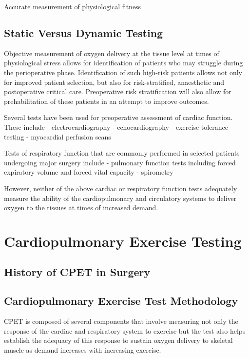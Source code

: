 Accurate measurement of physiological fitness 

\subsection{Static Versus Dynamic Testing}

Objective measurement of oxygen delivery at the tissue level at times of physiological stress allows for identification of patients who may struggle during the perioperative phase. Identification of such high-risk patients allows not only for improved patient selection, but also for risk-stratified, anaesthetic and postoperative critical care. Preoperative risk stratification will also allow for prehabilitation of these patients in an attempt to improve outcomes. 

Several tests have been used for preoperative assessment of cardiac function. These include 
- electrocardiography 
- echocardiography 
- exercise tolerance testing 
- myocardial perfusion scans 

Tests of respiratory function that are commonly performed in selected patients undergoing major surgery include 
- pulmonary function tests including forced expiratory volume and forced vital capacity 
- spirometry 

However, neither of the above cardiac or respiratory function tests adequately measure the ability of the cardiopulmonary and circulatory systems to deliver oxygen to the tissues at times of increased demand.

\section{Cardiopulmonary Exercise Testing}
\subsection{History of CPET in Surgery}

\subsection{Cardiopulmonary Exercise Test Methodology}
CPET is composed of several components that involve measuring not only the response of the cardiac and respiratory system to exercise but the test also helps establish the adequacy of this response to sustain oxygen delivery to skeletal muscle as demand increases with increasing exercise. 

